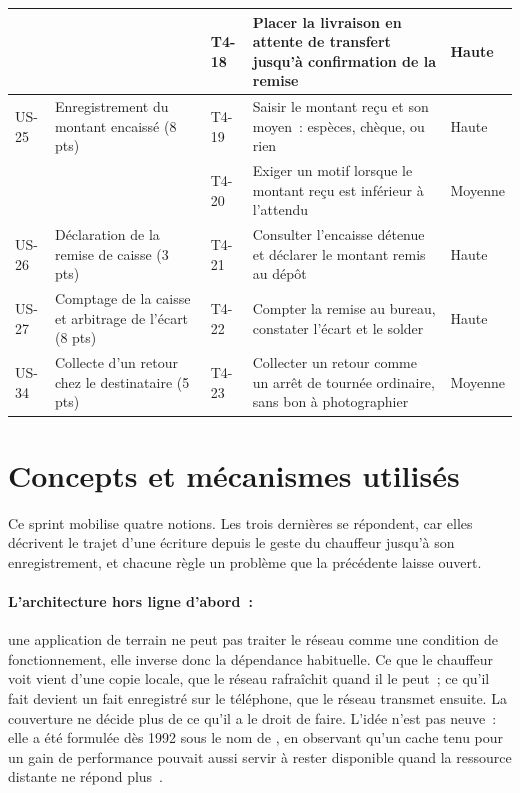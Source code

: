 \begin{small}
\begin{longtable}{L{1.1cm}L{3.0cm}L{1.2cm}L{7.0cm}L{1.4cm}}
\hline
      &  & T4-18 & Placer la livraison en attente de transfert jusqu'à confirmation de la remise & Haute \\
\hline
US-25 & Enregistrement du montant encaissé (8 pts) & T4-19 & Saisir le montant reçu et son moyen~: espèces, chèque, ou rien & Haute \\
\hline
      &  & T4-20 & Exiger un motif lorsque le montant reçu est inférieur à l'attendu & Moyenne \\
\hline
US-26 & Déclaration de la remise de caisse (3 pts) & T4-21 & Consulter l'encaisse détenue et déclarer le montant remis au dépôt & Haute \\
\hline
US-27 & Comptage de la caisse et arbitrage de l'écart (8 pts) & T4-22 & Compter la remise au bureau, constater l'écart et le solder & Haute \\
\hline
US-34 & Collecte d'un retour chez le destinataire (5 pts) & T4-23 & Collecter un retour comme un arrêt de tournée ordinaire, sans bon à photographier & Moyenne \\
\hline
\end{longtable}
\end{small}

\section{Concepts et mécanismes utilisés}

Ce sprint mobilise quatre notions. Les trois dernières se répondent, car elles décrivent le trajet d'une
écriture depuis le geste du chauffeur jusqu'à son enregistrement, et chacune règle un problème que la
précédente laisse ouvert.

\paragraph{L'architecture hors ligne d'abord~:} une application de terrain ne peut pas traiter le
réseau comme une condition de fonctionnement, elle inverse donc la dépendance habituelle. Ce que le
chauffeur voit vient d'une copie locale, que le réseau rafraîchit quand il le peut~; ce qu'il fait
devient un fait enregistré sur le téléphone, que le réseau transmet ensuite. La couverture ne décide
plus de ce qu'il a le droit de faire. L'idée n'est pas neuve~: elle a été formulée dès 1992 sous le
nom de , en observant qu'un cache tenu pour un gain de performance
pouvait aussi servir à rester disponible quand la ressource distante ne répond plus~\cite{kistler92}.

